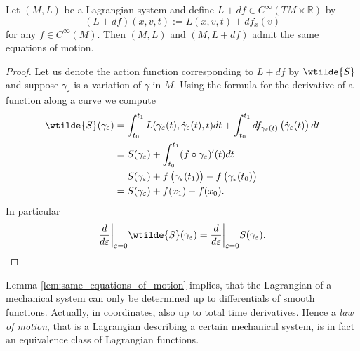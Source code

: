 \begin{lemma}
	\label{lem:same_equations_of_motion}
	Let $(M,L)$ be a Lagrangian system and define $L + df \in C^\infty(TM \times \mathbb{R})$ by
	\begin{equation*}
		(L + df)(x,v,t) := L(x,v,t) + df_x(v)
	\end{equation*}
	\noindent for any $f \in C^\infty(M)$. Then $(M,L)$ and $(M,L + df)$ admit the same equations of motion.
\end{lemma}

\begin{proof}
	Let us denote the action function corresponding to $L + df$ by $\wtilde{S}$ and suppose $\gamma_\varepsilon$ is a variation of $\gamma$ in $M$. Using the formula for the derivative of a function along a curve \cite[283]{lee:smooth_manifolds:2013} we compute
	\begin{align*}
		\wtilde{S}(\gamma_\varepsilon) &= \int_{t_0}^{t_1}L(\gamma_\varepsilon(t),\dot{\gamma}_\varepsilon(t),t)dt + \int_{t_0}^{t_1}df_{\gamma_\varepsilon(t)}\del[1]{\dot{\gamma}_\varepsilon(t)}dt\\
		&= S(\gamma_\varepsilon) + \int_{t_0}^{t_1}(f \circ \gamma_\varepsilon)'(t)dt\\
		&= S(\gamma_\varepsilon) + f\del[1]{\gamma_\varepsilon(t_1)} - f\del[1]{\gamma_{\varepsilon}(t_0)}\\
		&= S(\gamma_\varepsilon) + f(x_1) - f(x_0).
	\end{align*}
	In particular
	\begin{equation*}
		\frac{d}{d\varepsilon}\bigg\vert_{\varepsilon = 0}\wtilde{S}(\gamma_\varepsilon) = \frac{d}{d\varepsilon}\bigg\vert_{\varepsilon = 0}S(\gamma_\varepsilon).
	\end{equation*}
\end{proof}

\begin{remark}
	Lemma \ref{lem:same_equations_of_motion} implies, that the Lagrangian of a mechanical system can only be determined up to differentials of smooth functions. Actually, in coordinates, also up to total time derivatives. Hence a \emph{law of motion}, that is a Lagrangian describing a certain mechanical system, is in fact an equivalence class of Lagrangian functions.
\end{remark}
